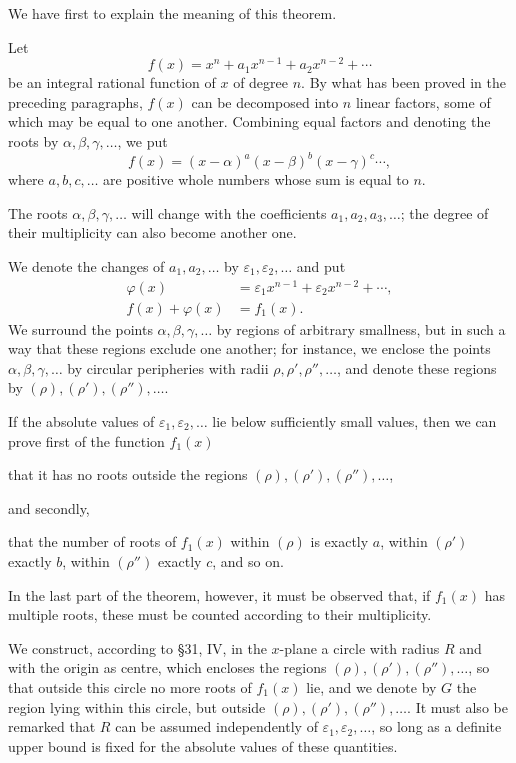 \documentclass[11pt]{article}
\begin{document}
We have first to explain the meaning of this theorem.

Let
\begin{equation}
 f(x)=x^n+a_1x^{n-1}+a_2x^{n-2}+\cdots
\tag{1}
\end{equation}
be an integral rational function of $x$ of degree $n$. By what has been proved in the preceding paragraphs, $f(x)$ can be decomposed into $n$ linear factors, some of which may be equal to one another. Combining equal factors and denoting the roots by $\alpha,\beta,\gamma,\ldots$, we put
\begin{equation}
 f(x)=(x-\alpha)^a(x-\beta)^b(x-\gamma)^c\cdots,
\tag{2}
\end{equation}
where $a,b,c,\ldots$ are positive whole numbers whose sum is equal to $n$.

The roots $\alpha,\beta,\gamma,\ldots$ will change with the coefficients $a_1,a_2,a_3,\ldots$; the degree of their multiplicity can also become another one.

We denote the changes of $a_1,a_2,
\ldots$ by $\varepsilon_1,\varepsilon_2,\ldots$ and put
\begin{align}
 \varphi(x)&=\varepsilon_1x^{n-1}+\varepsilon_2x^{n-2}+\cdots,
\tag{3}\\
 f(x)+\varphi(x)&=f_1(x).
\tag{4}
\end{align}
We surround the points $\alpha,\beta,\gamma,
\ldots$ by regions of arbitrary smallness, but in such a way that these regions exclude one another; for instance, we enclose the points $\alpha,\beta,\gamma,
\ldots$ by circular peripheries with radii $\rho,\rho',\rho'',\ldots$, and denote these regions by $(\rho),(\rho'),(\rho''),\ldots$.

If the absolute values of $\varepsilon_1,\varepsilon_2,
\ldots$ lie below sufficiently small values, then we can prove first of the function $f_1(x)$
\begin{center}
that it has no roots outside the regions $(\rho),(\rho'),(\rho''),\ldots$,
\end{center}
and secondly,
\begin{center}
that the number of roots of $f_1(x)$ within $(\rho)$ is exactly $a$, within $(\rho')$ exactly $b$, within $(\rho'')$ exactly $c$, and so on.
\end{center}
In the last part of the theorem, however, it must be observed that, if $f_1(x)$ has multiple roots, these must be counted according to their multiplicity.

We construct, according to \S 31, IV, in the $x$-plane a circle with radius $R$ and with the origin as centre, which encloses the regions $(\rho),(\rho'),(\rho''),\ldots$, so that outside this circle no more roots of $f_1(x)$ lie, and we denote by $G$ the region lying within this circle, but outside $(\rho),(\rho'),(\rho''),\ldots$. It must also be remarked that $R$ can be assumed independently of $\varepsilon_1,\varepsilon_2,\ldots$, so long as a definite upper bound is fixed for the absolute values of these quantities.
\end{document}
